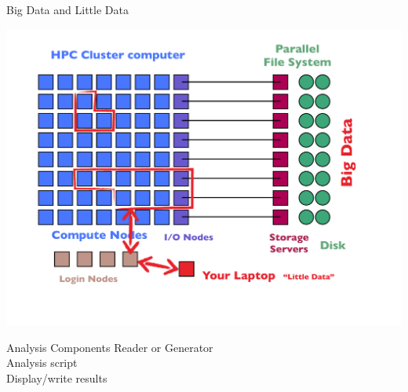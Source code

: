\begin{frame}{Big Data and Little Data}
\begin{minipage}{8.5cm}
  \includegraphics[trim=3cm 0cm 0cm 0cm,clip=true,height=0.9\textheight]
  {../common/pics/hardware/ParallelHardware22.pdf}\hfill
\end{minipage}
\begin{minipage}{3cm}\small
  \begin{block}{Analysis Components}\pause
    \scriptsize Reader or Generator \\
    Analysis script \\
    Display/write results
  \end{block}
\end{minipage}
\end{frame}

